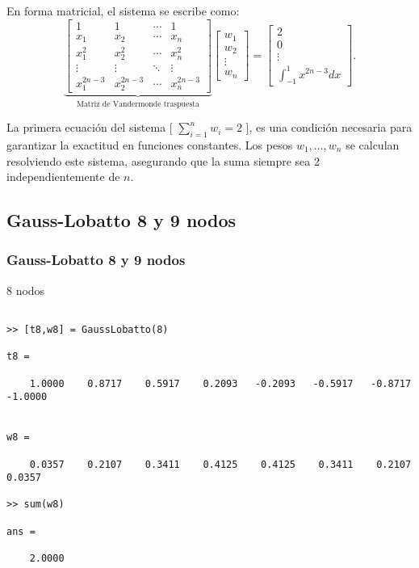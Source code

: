 \documentclass{beamer}
\begin{document}
\begin{frame}
\noindent En forma matricial, el sistema se escribe como:
\[
\underbrace{
\begin{bmatrix}
1 & 1 & \cdots & 1 \\
x_1 & x_2 & \cdots & x_n \\
x_1^2 & x_2^2 & \cdots & x_n^2 \\
\vdots & \vdots & \ddots & \vdots \\
x_1^{2n-3} & x_2^{2n-3} & \cdots & x_n^{2n-3}
\end{bmatrix}
}_{\text{Matriz de Vandermonde traspuesta}}
\begin{bmatrix}
w_1 \\
w_2 \\
\vdots \\
w_n
\end{bmatrix}
=
\begin{bmatrix}
2 \\
0 \\
\vdots \\
\int_{-1}^1 x^{2n-3} dx
\end{bmatrix}.
\]

\noindent La primera ecuación del sistema [ $\sum_{i=1}^n w_i = 2$ ], es una condición necesaria para garantizar la exactitud en funciones constantes. Los pesos \( w_1, \ldots, w_n \) se calculan resolviendo este sistema, asegurando que la suma siempre sea 2 independientemente de \( n \).
\end{frame}
\subsection{Gauss-Lobatto 8 y 9 nodos}
\begin{frame}
\frametitle{Gauss-Lobatto 8 y 9 nodos}
\begin{block}{8 nodos}
\begin{verbatim}

>> [t8,w8] = GaussLobatto(8)

t8 =

    1.0000    0.8717    0.5917    0.2093   -0.2093   -0.5917   -0.8717   -1.0000


w8 =

    0.0357    0.2107    0.3411    0.4125    0.4125    0.3411    0.2107    0.0357
    
>> sum(w8)

ans =

    2.0000
\end{verbatim}
\end{block}
\end{frame}
\end{document}
